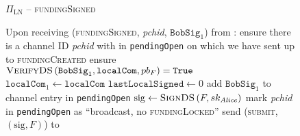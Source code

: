 
  \begin{figure}[H]
    \begin{protocolbox}{$\Pi_{\mathrm{LN}}$ -- \textsc{fundingSigned}}
      \begin{algorithmic}[1]
        \State Upon receiving (\textsc{fundingSigned}, \textit{pchid},
        $\mathtt{BobSig}_1$) from \bob:
        \Indent
          \State ensure there is a channel ID \textit{pchid} with \bob{} in
          \texttt{pendingOpen} on which we have sent up to
          \textsc{fundingCreated}
          \State ensure $\textsc{VerifyDS}\left(\mathtt{BobSig}_1,
          \mathtt{localCom}, pb_F\right) = \mathtt{True}$
          \State $\mathtt{localCom}_1 \gets \mathtt{localCom}$
          \State $\mathtt{lastLocalSigned} \gets 0$
          \State add $\mathtt{BobSig}_1$ to channel entry in
          \texttt{pendingOpen}
          \State $\mathrm{sig} \gets \textsc{SignDS}\left(F,
          sk_{\mathit{Alice}}\right)$
          \State mark \textit{pchid} in \texttt{pendingOpen} as ``broadcast, no
          \textsc{fundingLocked}''
          \label{alg:protocol:open:fundingSigned:mark}
          \State send (\textsc{submit}, $\left(\mathrm{sig}, F\right)$) to
          \ledger
        \EndIndent
      \end{algorithmic}
    \end{protocolbox}
    \caption{}
    \label{alg:protocol:open:fundingSigned}
  \end{figure}


